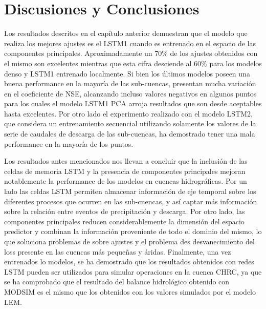 \chapter{Discusiones y Conclusiones}
\label{Discusiones y conclusiones}

Los resultados descritos en el capítulo anterior demuestran que el modelo que realiza los mejores ajustes es el LSTM1 cuando es entrenado en 
el espacio de las componentes principales. Aproximadamente un 70$\%$ de los ajustes obtenidos con el mismo son excelentes mientras que esta cifra  
desciende al 60$\%$ para los modelos denso y LSTM1 entrenado localmente. Si bien los últimos modelos poseen una buena performance en la mayoría de 
las sub-cuencas, presentan mucha variación en el coeficiente de NSE, alcanzando incluso valores negativos en algunos puntos para los cuales 
el modelo LSTM1 PCA arroja resultados que son desde aceptables hasta excelentes. Por otro lado el experimento realizado con el modelo LSTM2, que considera 
un entrenamiento secuencial utilizando solamente los valores de la serie de caudales de descarga de las sub-cuencas, ha demostrado
tener una  mala performance en la mayoría de los puntos. 

Los resultados antes mencionados nos llevan a concluir que la inclusión de las celdas de memoria LSTM y la presencia de componentes principales 
mejoran notablemente la performance de los modelos en cuencas hidrográficas. 
Por un lado las celdas LSTM permiten almacenar información de eje temporal sobre los diferentes procesos  que ocurren en  las sub-cuencas,
y así captar más información sobre la relación entre eventos de precipitación y descarga. Por otro lado, 
las componentes principales reducen considerablemente la dimensión del espacio predictor
y combinan la información proveniente de todo el dominio del mismo, lo que soluciona problemas de sobre ajustes y el problema
des desvanecimiento del loss presente en las cuencas más pequeñas y áridas. 
Finalmente, una vez entrenados lo modelos, se ha demostrado que los resultados obtenidos con redes LSTM
pueden ser utilizados para simular operaciones en la cuenca CHRC, ya que se ha comprobado que
el resultado del balance hidrológico obtenido con MODSIM es el mismo que los obtenidos con los valores simulados por el modelo LEM.

